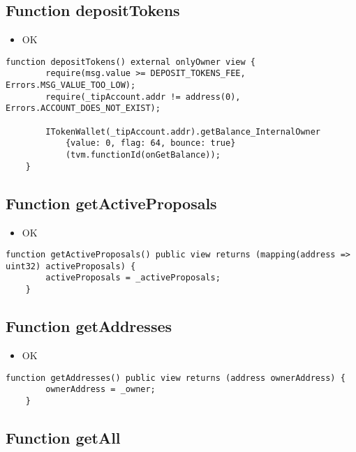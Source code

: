 \subsection{Function depositTokens}

\begin{itemize}
\item OK
\end{itemize}

\begin{lstlisting}[firstnumber=172]
    function depositTokens() external onlyOwner view {
        require(msg.value >= DEPOSIT_TOKENS_FEE, Errors.MSG_VALUE_TOO_LOW);
        require(_tipAccount.addr != address(0), Errors.ACCOUNT_DOES_NOT_EXIST);

        ITokenWallet(_tipAccount.addr).getBalance_InternalOwner
            {value: 0, flag: 64, bounce: true}
            (tvm.functionId(onGetBalance));
    }
\end{lstlisting}

\subsection{Function getActiveProposals}

\begin{itemize}
\item OK
\end{itemize}

\begin{lstlisting}[firstnumber=228]
    function getActiveProposals() public view returns (mapping(address => uint32) activeProposals) {
        activeProposals = _activeProposals;
    }
\end{lstlisting}

\subsection{Function getAddresses}

\begin{itemize}
\item OK
\end{itemize}

\begin{lstlisting}[firstnumber=224]
    function getAddresses() public view returns (address ownerAddress) {
        ownerAddress = _owner;
    }
\end{lstlisting}

\subsection{Function getAll}

